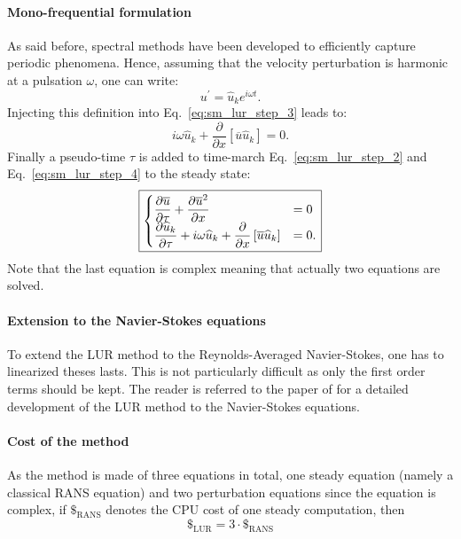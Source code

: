 \paragraph{Mono-frequential formulation}
As said before, spectral methods have been developed to efficiently
capture periodic phenomena.
Hence, assuming that the velocity perturbation is harmonic at 
a pulsation $\omega$, one can write:
\begin{equation}
	u^\prime = \widehat{u}_k e^{i \omega t}.
\end{equation}
Injecting this definition into Eq.~\ref{eq:sm_lur_step_3} leads
to:
\begin{equation}
	i \omega \widehat{u}_k +
	\frac{\partial}{\partial x} \left[
	\overline{u} \widehat{u}_k \right] = 
	0.
	\label{eq:sm_lur_step_4}
\end{equation}
Finally a pseudo-time $\tau$ is added to time-march 
Eq.~\ref{eq:sm_lur_step_2} and Eq.~\ref{eq:sm_lur_step_4}
to the steady state:
\begin{equation}
	\fbox{$
	\begin{cases}
		\displaystyle 
		\frac{\partial \overline{u}}{\partial \tau} +
		\frac{\partial 
			\overline{u}^2}{\partial x} &= 0 \\
		\displaystyle \frac{\partial \widehat{u}_k}{\partial \tau} +
		i \omega \widehat{u}_k +
			\frac{\partial}{\partial x} \left[
			\overline{u} \widehat{u}_k \right] &= 
			0.
	\end{cases}
	$}
\end{equation}
Note that the last equation is complex meaning that actually two
equations are solved.

\paragraph{Extension to the Navier-Stokes equations}
To extend the LUR method to the Reynolds-Averaged
Navier-Stokes, one has to linearized theses lasts. This
is not particularly difficult as only the first order terms should
be kept. The reader is referred to the paper of \citet{Clark2000} for
a detailed development of the LUR method to the Navier-Stokes
equations.

\paragraph{Cost of the method}
As the method is made of three equations in total, one steady equation 
(namely a classical RANS equation) and two perturbation equations
since the equation is complex, if $\mathdollar_{\text{RANS}}$ 
denotes the CPU cost of
one steady computation, then
\begin{equation}
	\mathdollar_{\text{LUR}} = 3 \cdot \mathdollar_{\text{RANS}}
\end{equation}